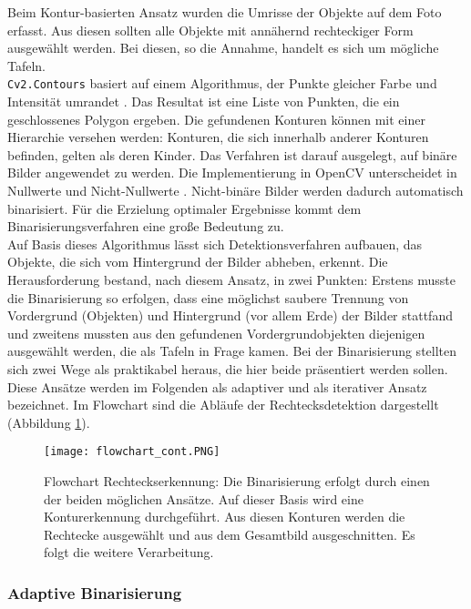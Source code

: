 Beim Kontur-basierten Ansatz wurden die Umrisse der Objekte auf dem Foto erfasst. Aus diesen sollten alle Objekte mit annähernd rechteckiger Form ausgewählt werden. Bei diesen, so die Annahme, handelt es sich um mögliche Tafeln.\\
\verb|Cv2.Contours| basiert auf einem Algorithmus, der Punkte gleicher Farbe und Intensität umrandet \cite{findcontours}. Das Resultat ist eine Liste von Punkten, die ein geschlossenes Polygon ergeben. Die gefundenen Konturen können mit einer Hierarchie versehen werden: Konturen, die sich innerhalb anderer Konturen befinden, gelten als deren \glqq Kinder\grqq. Das Verfahren ist darauf ausgelegt, auf binäre Bilder angewendet zu werden. Die Implementierung in OpenCV unterscheidet in Nullwerte und Nicht-Nullwerte \cite{opencvcontours}. Nicht-binäre Bilder werden dadurch automatisch binarisiert. Für die Erzielung optimaler Ergebnisse kommt dem Binarisierungsverfahren eine große Bedeutung zu.\\
Auf Basis dieses Algorithmus lässt sich Detektionsverfahren aufbauen, das Objekte, die sich vom Hintergrund der Bilder abheben, erkennt. Die Herausforderung bestand, nach diesem Ansatz, in zwei Punkten: Erstens musste die Binarisierung so erfolgen, dass eine möglichst saubere Trennung von Vordergrund (Objekten) und Hintergrund (vor allem Erde) der Bilder stattfand und zweitens mussten aus den gefundenen Vordergrundobjekten diejenigen ausgewählt werden, die als Tafeln in Frage kamen. Bei der Binarisierung stellten sich zwei Wege als praktikabel heraus, die hier beide präsentiert werden sollen. Diese Ansätze werden im Folgenden als adaptiver und als iterativer Ansatz bezeichnet. Im Flowchart sind die Abläufe der Rechtecksdetektion dargestellt (Abbildung \ref{fig:flowrectdetect}).
\begin{figure}[h!]
\centering
\texttt{[image: flowchart\_cont.PNG]}
\caption{Flowchart Rechteckserkennung: Die Binarisierung erfolgt durch einen der beiden möglichen Ansätze. Auf dieser Basis wird eine Konturerkennung durchgeführt. Aus diesen Konturen werden die Rechtecke ausgewählt und aus dem Gesamtbild ausgeschnitten. Es folgt die weitere Verarbeitung.}
\label{fig:flowrectdetect}
\end{figure}

\subsubsection*{Adaptive Binarisierung}

